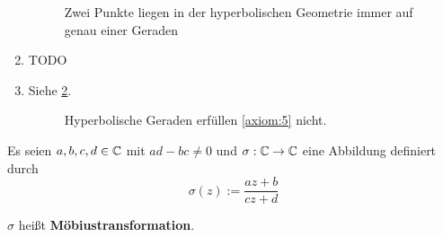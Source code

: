 \begin{beweis}
\begin{enumerate}[label=\alph*), ref=\theproposition (\alph*)]
            \begin{figure}[ht]
                \centering
                \subfloat[Fall 1]{
                    \resizebox{0.45\linewidth}{!}{}
                    \label{fig:hyperbolische-geometrie-axiom-1-1}
                }%
                \subfloat[Fall 2]{
                    \resizebox{0.45\linewidth}{!}{}
                    \label{fig:hyperbolische-geometrie-axiom-1-2}
                }%
                \label{fig:hyperbolische-geometrie-axiom-1-0}
                \caption{Zwei Punkte liegen in der hyperbolischen Geometrie immer auf genau einer Geraden}
            \end{figure}
        \item TODO
        \item Siehe \cref{fig:hyperbolische-halbebene-axiom-5}.
            \begin{figure}[hp]
                \centering
                
                \caption{Hyperbolische Geraden erfüllen \ref{axiom:5} nicht.}
                \label{fig:hyperbolische-halbebene-axiom-5}
            \end{figure}
    \end{enumerate}
\end{beweis}

\begin{definition}%
    Es seien $a,b,c,d \in \mathbb{C}$ mit $ad - bc \neq 0$ und 
    $\sigma: \mathbb{C} \rightarrow \mathbb{C}$ eine Abbildung definiert durch 
    \[\sigma(z) := \frac{az + b}{cz+d}\]

    $\sigma$ heißt \textbf{Möbiustransformation}.
\end{definition}

